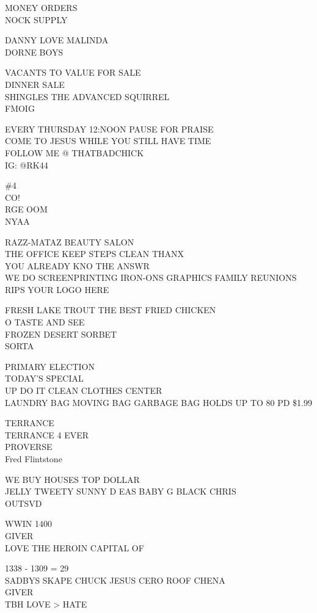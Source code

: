 \documentclass[10pt,letterpaper]{article}
\begin{document}
MONEY ORDERS\\
NOCK SUPPLY

DANNY LOVE MALINDA\\
DORNE BOYS

VACANTS TO VALUE FOR SALE\\
DINNER SALE\\
SHINGLES THE ADVANCED SQUIRREL\\
FMOIG

EVERY THURSDAY 12:NOON PAUSE FOR PRAISE\\
COME TO JESUS WHILE YOU STILL HAVE TIME\\
FOLLOW ME @ THATBADCHICK\\
IG: @RK44

\#4\\
CO!\\
RGE OOM\\
NYAA

RAZZ{-}MATAZ BEAUTY SALON\\
THE OFFICE KEEP STEPS CLEAN THANX\\
YOU ALREADY KNO THE ANSWR\\
WE DO SCREENPRINTING IRON{-}ONS GRAPHICS FAMILY REUNIONS RIPS YOUR LOGO HERE

FRESH LAKE TROUT THE BEST FRIED CHICKEN\\
O TASTE AND SEE\\
FROZEN DESERT SORBET\\
SORTA

PRIMARY ELECTION\\
TODAY'S SPECIAL\\
UP DO IT CLEAN CLOTHES CENTER\\
LAUNDRY BAG MOVING BAG GARBAGE BAG HOLDS UP TO 80 PD \$1.99

TERRANCE\\
TERRANCE 4 EVER\\
PROVERSE\\
Fred Flintstone

WE BUY HOUSES TOP DOLLAR\\
JELLY TWEETY SUNNY D EAS BABY G BLACK CHRIS\\
OUTSVD

WWIN 1400\\
GIVER\\
LOVE THE HEROIN CAPITAL OF

1338 {-} 1309 = 29\\
SADBYS SKAPE CHUCK JESUS CERO ROOF CHENA\\
GIVER\\
TBH LOVE > HATE
\pagebreak
\end{document}
